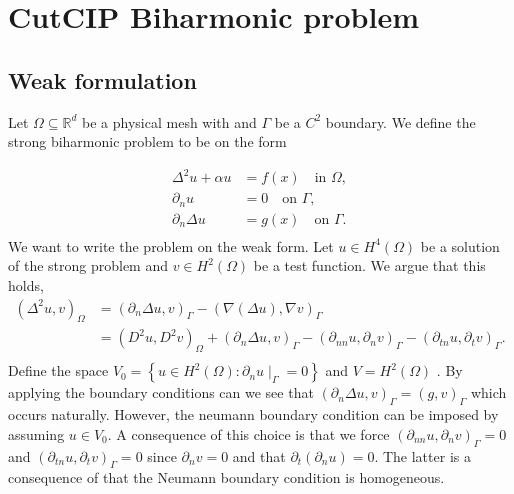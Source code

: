 
\newpage
\section{CutCIP Biharmonic problem}%
\label{sec:cutcip_biharmonic_problem}

\subsection{Weak formulation}%
\label{sub:weak_formulation}


Let $\Omega \subseteq    \mathbb{R} ^d$ be a physical mesh with and $\Gamma  $ be a $C^2$ boundary. We define the strong biharmonic problem to be on the form

\begin{equation}
\begin{split}
    \Delta^2  u  + \alpha  u  & = f( x)  \quad \text{in } \Omega,   \\
    \partial _{n} u & = 0  \quad \text{on } \Gamma ,  \\
    \partial _{n} \Delta  u & = g(x)  \quad \text{on } \Gamma  .  \\
\end{split}
\end{equation}
We want to write the problem on the weak form.
Let $u \in H^{4}( \Omega ) $ be a solution of the strong problem and $v \in H^{2}( \Omega ) $ be a test function. We argue that this holds,
    \[
        \begin{split}
(\Delta ^2u,v )_{\Omega } & = ( \partial _{n} \Delta u, v)_{\Gamma } - ( \nabla ( \Delta u) , \nabla v) _{\Gamma } \\
&= ( D^2u, D^2v)_{\Omega } + ( \partial _{n} \Delta u ,v)_{\Gamma } - ( \partial _{nn} u, \partial _{n}v)_{\Gamma } - ( \partial _{tn} u, \partial _{t} v)_{\Gamma }.        \\
        \end{split}
    \]
    Define the space $V_{0} = \left\{ u \in H^{2}( \Omega ) :  \partial _{n}u  \mid _{\Gamma } = 0 \right \} $ and $V = H^2( \Omega ) $ .
    By applying the boundary conditions can we see that $( \partial _{n} \Delta u, v)_\Gamma   = ( g,v)_{\Gamma }$ which occurs naturally. However, the neumann boundary condition can be imposed by assuming $u \in V_{0}$.
    A consequence of this choice is that we force $ ( \partial _{nn} u, \partial _{n}v)_{\Gamma }
    = 0$ and $( \partial _{tn} u, \partial _{t}v)_{\Gamma } = 0$ since $\partial _{n} v = 0$ and that $\partial _{t} (\partial _{n}u) = 0 $. The latter is a consequence of that the Neumann boundary condition is homogeneous.

